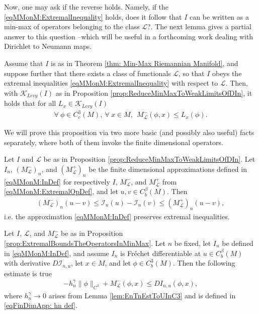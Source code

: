 \documentclass[11pt,reqno]{amsart}
\numberwithin{equation}{section}
\theoremstyle{plain}
\def\I{\mathcal I}
\def\K{\mathcal K}
\def\L{\mathcal L}
\def\gam{\gamma}
\newcommand{\norm}[1]{\lVert#1\rVert}
\begin{document}
  Now, one may ask if the reverse holds. Namely, if the \eqref{eqMMonM:ExtremalInequality} holds, does it follow that $I$ can be written as a min-max of operators belonging to the class $\mathcal{L}$?. The next lemma gives a partial answer to this question --which will be useful in a forthcoming work dealing with Dirichlet to Neumann maps. 

\begin{prop}\label{prop:ExtremalBoundsTheOperatorsInMinMax}
	Assume that $I$ is as in Theorem \ref{thm: Min-Max Riemannian Manifold}, and suppose further that there exists a class of functionals $\L$, so that $I$ obeys the extremal inequalities \eqref{eqMMonM:ExtremalInequality} with respect to $\L$.  Then, with $\K_{Levy}(I)$ as in Proposition \ref{prop:ReduceMinMaxToWeakLimitsOfDIn}, it holds that for all $L_x\in\K_{Levy}(I)$
	\begin{align*}
		\forall\ \phi\in C^3_c(M),\ \forall\ x\in M,\ \ M^-_\L(\phi,x)\leq  L_x(\phi).
	\end{align*}
\end{prop} 

We will prove this proposition via two more basic (and possibly also useful) facts separately, where both of them invoke the finite dimensional operators. 
  
\begin{lem}\label{lem:ApproximateExtremalInequality}
	Let $I$ and $\L$ be as in Proposition \ref{prop:ReduceMinMaxToWeakLimitsOfDIn}. Let $I_n$, $(M^-_\L)_n$, and $(M^+_\L)_n$ be the finite dimensional approximations defined in \eqref{eqMMonM:InDef} for respectively $I$, $M^-_\L$, and $M^+_\L$ from \eqref{eqMMonM:ExtremalOpDef}, and let $u,v\in C^\beta_b(M)$.  Then
	\begin{align*}
		(M^-_\L)_n(u-v)\leq \I_n(u)-\I_n(v) \leq (M^+_\L)_n(u-v),
	\end{align*}
	i.e. the approximation \eqref{eqMMonM:InDef} preserves extremal inequalities.
\end{lem}

\begin{lem}\label{lem:ApproxLowerBoundOnFrechetDeriv}
	Let $I$, $\L$, and $M^-_\L$ be as in Proposition \ref{prop:ExtremalBoundsTheOperatorsInMinMax}.  Let $n$ be fixed, let $I_n$ be defined in \eqref{eqMMonM:InDef}, and assume $I_n$ is Fr\'echet differentiable at $u\in C^\beta_b(M)$ with derivative $D\I_{n,u}$, let $x\in M$, and let $\phi\in C^3_b(M)$.  Then the following estimate is true
	\begin{align*}
		-h_n^\gam \norm{\phi}_{C^3} + M^-_\L(\phi,x)\leq D I_{n,u}(\phi,x),
	\end{align*}
	where $h_n^\gam\to0$ arises from Lemma \ref{lem:EnTnEstToUInC3} and is defined in \eqref{eqFinDimApp: hn def}.
\end{lem}
\end{document}
